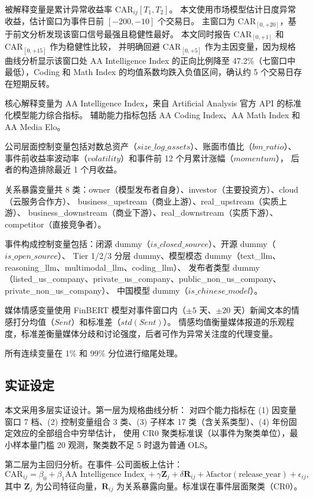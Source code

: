 \documentclass[11pt,fontset=fandol,a4paper]{ctexart}
\begin{document}
被解释变量是累计异常收益率 $\text{CAR}_{ij}[T_1,T_2]$。
本文使用市场模型估计日度异常收益，估计窗口为事件日前 $[-200,-10]$ 个交易日。
主窗口为 $\text{CAR}_{[0,+20]}$，基于前文分析发现该窗口信号最强且稳健性最好。
本文同时报告 $\text{CAR}_{[0,+1]}$ 和 $\text{CAR}_{[0,+15]}$ 作为稳健性比较，
并明确回避 $\text{CAR}_{[0,+5]}$ 作为主因变量，因为规格曲线分析显示该窗口处 AA Intelligence Index 的正向比例降至 47.2\%（七窗口中最低），Coding 和 Math Index 的均值系数均跌入负值区间，确认约 5 个交易日存在短期反转。

核心解释变量为 AA Intelligence Index，来自 Artificial Analysis 官方 API 的标准化模型能力综合指标。
辅助能力指标包括 AA Coding Index、AA Math Index 和 AA Media Elo。

公司层面控制变量包括对数总资产（$size\_log\_assets$）、账面市值比（$bm\_ratio$）、
事件前收益率波动率（$volatility$）和事件前 12 个月累计涨幅（$momentum$），
后者的构造排除最近 1 个月收益。

关系暴露变量共 8 类：owner（模型发布者自身）、investor（主要投资方）、cloud（云服务合作方）、
business\_upstream（商业上游）、real\_upstream（实质上游）、
business\_downstream（商业下游）、real\_downstream（实质下游）、competitor（直接竞争者）。

事件构成控制变量包括：闭源 dummy（$is\_closed\_source$）、开源 dummy（$is\_open\_source$）、
Tier 1/2/3 分层 dummy、模型模态 dummy（text\_llm、reasoning\_llm、multimodal\_llm、coding\_llm）、
发布者类型 dummy（listed\_us\_company、private\_us\_company、public\_non\_us\_company、private\_non\_us\_company）、
中国模型 dummy（$is\_chinese\_model$）。

媒体情感变量使用 FinBERT 模型对事件窗口内（$\pm5$ 天、$\pm20$ 天）新闻文本的情感打分均值（$\overline{Sent}$）和标准差（$std(Sent)$）。
情感均值衡量媒体报道的乐观程度，标准差衡量媒体分歧和讨论强度，后者可作为异常关注度的代理变量。

所有连续变量在 1\% 和 99\% 分位进行缩尾处理。

\subsection{实证设定}

本文采用多层实证设计。第一层为规格曲线分析：
对四个能力指标在 (1) 因变量窗口 7 档、(2) 控制变量组合 3 类、(3) 子样本 17 类（含关系类型）、(4) 年份固定效应的全部组合中穷举估计，
使用 CR0 聚类标准误（以事件为聚类单位），最小样本量门槛 20 观测，聚类数不足 5 时退为普通 OLS。

第二层为主回归分析。在事件--公司面板上估计：
\begin{equation}
\text{CAR}_{ij} = \beta_0 + \beta_1 \text{AA Intelligence Index}_i + \gamma \mathbf{Z}_j + \delta \mathbf{R}_{ij}
+ \lambda \text{factor}(\text{release\_year}) + \epsilon_{ij},
\label{eq:main}
\end{equation}
其中 $\mathbf{Z}_j$ 为公司特征向量，$\mathbf{R}_{ij}$ 为关系暴露向量。标准误在事件层面聚类（CR0）。
\end{document}
